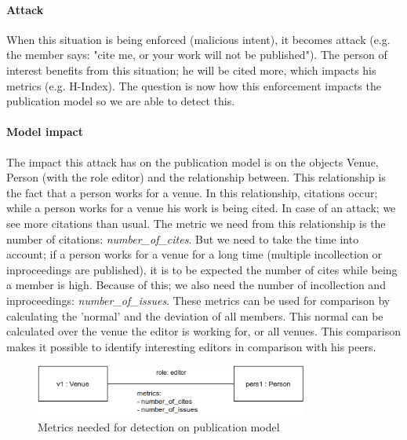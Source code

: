 \documentclass{ou-report}
\begin{document}
\paragraph{Attack} When this situation is being enforced (malicious intent), it 
becomes attack (e.g. the member says: "cite me, or your work will not be 
published"). The person of interest benefits 
from this situation; he will be cited more, which impacts his metrics (e.g. 
H-Index). The question is now how this enforcement impacts the 
publication model so we are able to detect this. 

\paragraph{Model impact}
The impact this attack has on the publication model is on the objects Venue, 
Person (with the role editor) and the relationship between. This relationship is 
the fact that a person works for a venue. In this relationship, citations occur; 
while a person works for a venue his work is being cited. In case of an attack; 
we see more citations than usual. The metric we need from this 
relationship is the number of citations: \textit{number\_of\_cites}. But we need 
to take the time into account; if a person works for a venue for a long time 
(multiple incollection or inproceedings are published), it is to be expected the 
number of cites while being a member is high. Because of this; we also need the 
number of incollection and inproceedings: \textit{number\_of\_issues}.
These metrics can be used for comparison by calculating the 'normal' and the 
deviation of all members. This normal can be calculated over the venue the 
editor is working for, or all venues. This comparison makes it possible to 
identify interesting editors in comparison with his peers.

\begin{figure}[H]
\centering
\includegraphics[width=9cm]{images/cite_work_editorial_boardmodel_impact.drawio.png}
\caption{Metrics needed for detection on publication model}
\label{fig:cwebimpact}
\end{figure}
\end{document}

